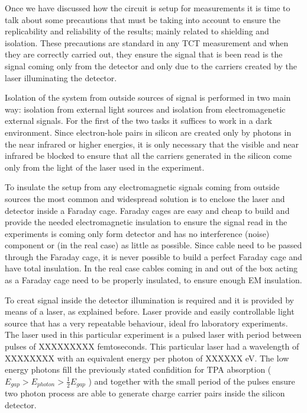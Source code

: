 Once we have discussed how the circuit is setup for measurements it is time to talk about some precautions that must be taking into account to ensure the replicability and reliability of the results; mainly related to shielding and isolation. These precautions are standard in any TCT measurement and when they are correctly carried out, they ensure the signal that is been read is the signal coming only from the detector and only due to the carriers created by the laser illuminating the detector.

Isolation of the system from outside sources of signal is performed in two main way: isolation from external light sources and isolation from electromagenetic external signals. For the first of the two tasks it suffices to work in a dark environment. Since electron-hole pairs in silicon are created only by photons in the near infrared or higher energies, it is only necessary that the visible and near infrared be blocked to ensure that all the carriers generated in the silicon come only from the light of the laser used in the experiment.

To insulate the setup from any electromagnetic signals coming from outside sources the most common and widespread solution is to enclose the laser and detector inside a Faraday cage. Faraday cages are easy and cheap to build and provide the needed electromagnetic insulation to ensure the signal read in the experiments is coming only form detector and has no interference (noise) component or (in the real case) as little as possible. Since cable need to be passed through the Faraday cage, it is never possible to build a perfect Faraday cage and have total insulation. In the real case cables coming in and out of the box acting as a Faraday cage need to be properly insulated, to ensure enough EM insulation.

To creat signal inside the detector illumination is required and it is provided by means of a laser, as explained before. Laser provide and easily controllable light source that has a very repeatable behaviour, ideal fro laboratory experiments. The laser used in this particular experiment is a pulsed laser with period between pulses of XXXXXXXXX femtoseconds. This particular laser had a wavelength of XXXXXXXX with an equivalent energy per photon of XXXXXX eV. The low energy photons fill the previously stated confidition for TPA absorption ($E_{gap} > E_{photon} > \frac{1}{2} E_{gap}$ ) and together with the small period of the pulses ensure two photon process are able to generate charge carrier pairs inside the silicon detector.

